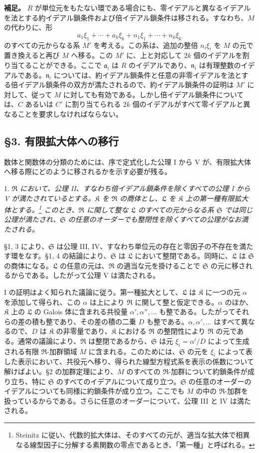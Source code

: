 \documentclass[11pt]{article}
\providecommand{\mR}{\mathfrak{R}}
\providecommand{\mK}{\mathfrak{K}}
\providecommand{\mL}{\mathfrak{L}}
\providecommand{\mS}{\mathfrak{S}}
\begin{document}
\medskip
\noindent\textbf{補足。} $R$ が単位元をもたない環である場合にも、零イデアルと異なるイデアルを法とする約イデアル鎖条件および倍イデアル鎖条件は移される。すなわち、$M$ の代わりに、形
\[
        a_1\xi_1+\cdots+a_k\xi_k+n_1\xi_1+\cdots+n_k\xi_k
\]
のすべての元からなる系 $M'$ を考える。この系は、追加の整倍 $n_i\xi_i$ を $M$ の元で置き換えると再び $M$ へ移る。この $M'$ に、上と対応して $2k$ 個のイデアルを割り当てることができる。ここで $\mathfrak a_i$ は $R$ のイデアルであり、$\mathfrak n_i$ は有理整数のイデアルである。$\mathfrak n_i$ については、約イデアル鎖条件と任意の非零イデアルを法とする倍イデアル鎖条件の双方が満たされるので、約イデアル鎖条件の証明は $M'$ に対して、従って $M$ に対しても有効である。しかし倍イデアル鎖条件については、$C$ あるいは $C'$ に割り当てられる $2k$ 個のイデアルがすべて零イデアルと異なることを要求しなければならない。

\subsection*{§3. 有限拡大体への移行}

数体と関数体の分類のためには、序で定式化した公理 I から V が、有限拡大体へ移る際にどのように移されるかを示す必要が残る。

1. \emph{$\mR$ において、公理 II、すなわち倍イデアル鎖条件を除くすべての公理 I から V が満たされているとする。$\mK$ を $\mR$ の商体とし、$\mL$ を $\mK$ 上の第一種有限拡大体とする。\footnote{Steinitz に従い、代数的拡大体は、そのすべての元が、適当な拡大体で相異なる線型因子に分解する素関数の零点であるとき、「第一種」と呼ばれる。} このとき、$\mR$ に関して整な $\mL$ のすべての元からなる系 $\mS$ では同じ公理が満たされ、$\mS$ の任意のオーダーでも整閉性を除くすべての公理がなお満たされる。}

§1, 3 により、$\mS$ は公理 III, IV、すなわち単位元の存在と零因子の不存在を満たす環をなす。§1, 4 の結論により、$\mS$ は $\mL$ において整閉である。同時に、$\mL$ は $\mS$ の商体になる。$\mL$ の任意の元は、$\mR$ の適当な元を掛けることで $\mS$ の元に移されるからである。したがって公理 V は満たされる。

I の証明はよく知られた議論に従う。第一種拡大として、$\mL$ は $\mK$ に一つの元 $\alpha$ を添加して得られ、この $\alpha$ は上により $\mR$ に関して整と仮定できる。$\alpha$ のほか、$\mK$ 上の $\mL$ の Galois 体に含まれる共役量 $\alpha',\alpha'',\ldots$ も整である。したがってそれらの差の積も整であり、その差の積の二乗 $D$ も整である。$\alpha,\alpha',\ldots$ はすべて異なるので、$D$ は $\mK$ の非零量であり、$\mK$ における $\mR$ の整閉性により $\mR$ の元である。通常の議論により、$\mR$ は整閉であるから、$\mS$ は元 $\xi_i=\alpha^i/D$ によって生成される有限 $\mR$-加群領域 $M$ に含まれる。このためには、$\mS$ の元を $\xi_i$ によって表した表示において、共役元へ移り、得られた線型方程式系を表示の係数について解けばよい。§2 の加群定理により、$M$ のすべての $\mR$-加群について約鎖条件が成り立ち、特に $\mS$ のすべてのイデアルについて成り立つ。$\mS$ の任意のオーダーのイデアルについても同様に約鎖条件が成り立つ。ここでも $M$ の中の $\mR$-加群を扱っているからである。さらに任意のオーダーについて、公理 III と IV は満たされる。
\end{document}
